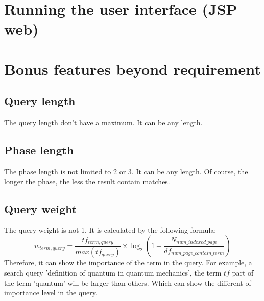 \documentclass{article}
\begin{document}
\begin{center}
    \end{center}

    \section*{Running the user interface (JSP web)}

    \newpage
    \section*{Bonus features beyond requirement}
        \subsection*{Query length}
            The query length don't have a maximum. It can be any length.    
        \subsection*{Phase length}
            The phase length is not limited to 2 or 3. It can be any length. Of course, the longer the phase, the less the result contain matches.
        
        \subsection*{Query weight}
            The query weight is not 1. It is calculated by the following formula:
            \begin{equation*}
                w_{term,query}=\frac{tf_{term,query}}{max(tf_{query})}\times\log_2(1+\frac{N_{num\_indexed\_page}}{df_{num\_page\_contain\_term}})
            \end{equation*}
            Therefore, it can show the importance of the term in the query. For example, a search query 'definition of quantum in quantum mechanics', the term $tf$ part of the term 'quantum' will be larger than others. Which can show the different of importance level in the query.
\end{document}
